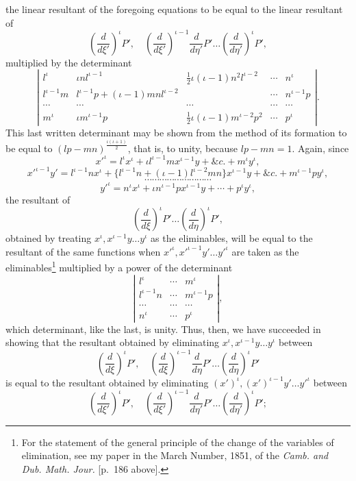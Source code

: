 \documentclass[11pt]{article}
\newcommand{\sourcepage}[1]{\marginpar{\scriptsize p.~#1}}
\begin{document}
\sourcepage{275}
the linear resultant of the foregoing equations to be equal to the linear resultant of
\[
\left(\frac{d}{d\xi'}\right)^\iota P',\quad
\left(\frac{d}{d\xi'}\right)^{\iota-1}\frac{d}{d\eta'}P'\ldots
\left(\frac{d}{d\eta'}\right)^\iota P',
\]
multiplied by the determinant
\[
\left|\begin{array}{ccccc}
l^\iota&\iota nl^{\iota-1}&\frac12\iota(\iota-1)n^2l^{\iota-2}&\cdots&n^\iota\\
l^{\iota-1}m&l^{\iota-1}p+(\iota-1)mnl^{\iota-2}& &\cdots&n^{\iota-1}p\\
\cdots&\cdots&\cdots&\cdots&\cdots\\
m^\iota&\iota m^{\iota-1}p&\frac12\iota(\iota-1)m^{\iota-2}p^2&\cdots&p^\iota
\end{array}\right|.
\]
This last written determinant may be shown from the method of its formation to be equal to $(lp-mn)^{\frac{\iota(\iota+1)}2}$, that is, to unity, because $lp-mn=1$. Again, since
\[
x'^\iota=l^\iota x^\iota+\iota l^{\iota-1}mx^{\iota-1}y+\&c.+m^\iota y^\iota,
\]
\[
x'^{\iota-1}y'=l^{\iota-1}nx^\iota+\{l^{\iota-1}n+(\iota-1)l^{\iota-2}mn\}x^{\iota-1}y+\&c.+m^{\iota-1}py^\iota,
\]
\[
\cdots\cdots\cdots\cdots\cdots\cdots\cdots\cdots\cdots
\]
\[
y'^\iota=n^\iota x^\iota+\iota n^{\iota-1}px^{\iota-1}y+\cdots+p^\iota y^\iota,
\]
the resultant of
\[
\left(\frac{d}{d\xi}\right)^\iota P'\ldots
\left(\frac{d}{d\eta}\right)^\iota P',
\]
obtained by treating $x^\iota,x^{\iota-1}y\ldots y^\iota$ as the eliminables, will be equal to the resultant of the same functions when $x'^\iota,x'^{\iota-1}y'\ldots y'^\iota$ are taken as the eliminables\footnote{For the statement of the general principle of the change of the variables of elimination, see my paper in the March Number, 1851, of the \emph{Camb. and Dub. Math. Jour.} [p.~186 above].} multiplied by a power of the determinant
\[
\left|\begin{array}{cccc}
l^\iota&\cdots&m^\iota\\
l^{\iota-1}n&\cdots&m^{\iota-1}p\\
\cdots&\cdots&\cdots\\
n^\iota&\cdots&p^\iota
\end{array}\right|,
\]
which determinant, like the last, is unity. Thus, then, we have succeeded in showing that the resultant obtained by eliminating $x^\iota,x^{\iota-1}y\ldots y^\iota$ between
\[
\left(\frac{d}{d\xi}\right)^\iota P',\quad
\left(\frac{d}{d\xi}\right)^{\iota-1}\frac{d}{d\eta}P'\ldots
\left(\frac{d}{d\eta}\right)^\iota P'
\]
is equal to the resultant obtained by eliminating $(x')^\iota,(x')^{\iota-1}y'\ldots y'^\iota$ between
\[
\left(\frac{d}{d\xi'}\right)^\iota P',\quad
\left(\frac{d}{d\xi'}\right)^{\iota-1}\frac{d}{d\eta'}P'\ldots
\left(\frac{d}{d\eta'}\right)^\iota P';
\]
\end{document}
